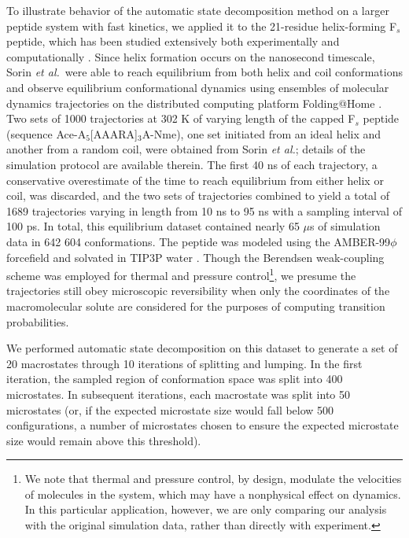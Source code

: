 To illustrate behavior of the automatic state decomposition method on a larger peptide system with fast kinetics, we applied it to the 21-residue helix-forming F$_s$ peptide, which has been studied extensively both experimentally \cite{lockhart:science:1992,lockhart:science:1993,williams:biochem:1996,eaton:biochem:1997,lednev:jacs:2001} and computationally \cite{garcia:2002a,duan:jpcb:2004,sorin:2005a,sorin:2005b}.
Since helix formation occurs on the nanosecond timescale, Sorin \emph{et al.}\ were able to reach equilibrium from both helix and coil conformations and observe equilibrium conformational dynamics using ensembles of molecular dynamics trajectories on the distributed computing platform Folding@Home \cite{sorin:2005b}.
Two sets of 1000 trajectories at 302 K of varying length of the capped F$_s$ peptide (sequence Ace-A$_5$[AAARA]$_3$A-Nme), one set initiated from an ideal helix and another from a random coil, were obtained from Sorin \emph{et al.}\cite{sorin:2005b}; details of the simulation protocol are available therein.
The first 40 ns of each trajectory, a conservative overestimate of the time to reach equilibrium from either helix or coil, was discarded, and the two sets of trajectories combined to yield a total of 1689 trajectories varying in length from 10 ns to 95 ns with a sampling interval of 100 ps.
In total, this equilibrium dataset contained nearly 65 $\mu$s of simulation data in 642 604 conformations.
The peptide was modeled using the AMBER-99$\phi$ forcefield \cite{AMBER-parm99,sorin:2005b} and solvated in TIP3P water \cite{jorgensen:1983a}.
Though the Berendsen weak-coupling scheme \cite{berendsen:1984a} was employed for thermal and pressure control\footnote{We note that thermal and pressure control, by design, modulate the velocities of molecules in the system, which may have a nonphysical effect on dynamics.  In this particular application, however, we are only comparing our analysis with the original simulation data, rather than directly with experiment.}, we presume the trajectories still obey microscopic reversibility when only the coordinates of the macromolecular solute are considered for the purposes of computing transition probabilities.

We performed automatic state decomposition on this dataset to generate a set of 20 macrostates through 10 iterations of splitting and lumping.
In the first iteration, the sampled region of conformation space was split into 400 microstates.
In subsequent iterations, each macrostate was split into 50 microstates (or, if the expected microstate size would fall below 500 configurations, a number of microstates chosen to ensure the expected microstate size would remain above this threshold). 

